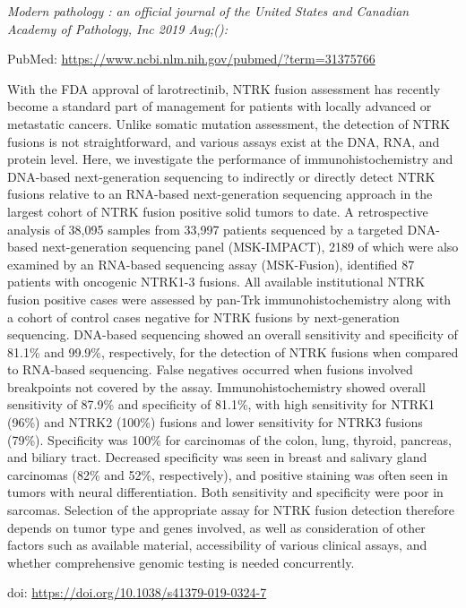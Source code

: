 \documentclass[]{article}
\begin{document}
\emph{Modern pathology : an official journal of the United States and
Canadian Academy of Pathology, Inc 2019 Aug;():}

PubMed: \url{https://www.ncbi.nlm.nih.gov/pubmed/?term=31375766}

With the FDA approval of larotrectinib, NTRK fusion assessment has
recently become a standard part of management for patients with locally
advanced or metastatic cancers. Unlike somatic mutation assessment, the
detection of NTRK fusions is not straightforward, and various assays
exist at the DNA, RNA, and protein level. Here, we investigate the
performance of immunohistochemistry and DNA-based next-generation
sequencing to indirectly or directly detect NTRK fusions relative to an
RNA-based next-generation sequencing approach in the largest cohort of
NTRK fusion positive solid tumors to date. A retrospective analysis of
38,095 samples from 33,997 patients sequenced by a targeted DNA-based
next-generation sequencing panel (MSK-IMPACT), 2189 of which were also
examined by an RNA-based sequencing assay (MSK-Fusion), identified 87
patients with oncogenic NTRK1-3 fusions. All available institutional
NTRK fusion positive cases were assessed by pan-Trk immunohistochemistry
along with a cohort of control cases negative for NTRK fusions by
next-generation sequencing. DNA-based sequencing showed an overall
sensitivity and specificity of 81.1\% and 99.9\%, respectively, for the
detection of NTRK fusions when compared to RNA-based sequencing. False
negatives occurred when fusions involved breakpoints not covered by the
assay. Immunohistochemistry showed overall sensitivity of 87.9\% and
specificity of 81.1\%, with high sensitivity for NTRK1 (96\%) and NTRK2
(100\%) fusions and lower sensitivity for NTRK3 fusions (79\%).
Specificity was 100\% for carcinomas of the colon, lung, thyroid,
pancreas, and biliary tract. Decreased specificity was seen in breast
and salivary gland carcinomas (82\% and 52\%, respectively), and
positive staining was often seen in tumors with neural differentiation.
Both sensitivity and specificity were poor in sarcomas. Selection of the
appropriate assay for NTRK fusion detection therefore depends on tumor
type and genes involved, as well as consideration of other factors such
as available material, accessibility of various clinical assays, and
whether comprehensive genomic testing is needed concurrently.

doi: \url{https://doi.org/10.1038/s41379-019-0324-7}

{}

{}
\end{document}
